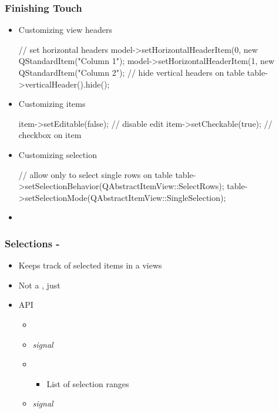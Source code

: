\begin{slide}[fragile]{}\frametitle{Finishing Touch}
\begin{itemize}
  \item Customizing view headers
  \begin{cpp}// set horizontal headers
model->setHorizontalHeaderItem(0, new QStandardItem("Column 1");
model->setHorizontalHeaderItem(1, new QStandardItem("Column 2");
// hide vertical headers on table
table->verticalHeader().hide();
\end{cpp}

  \item Customizing items
  \begin{cpp}item->setEditable(false); // disable edit
item->setCheckable(true); // checkbox on item
\end{cpp}

  \item Customizing selection
  \begin{cpp}// allow only to select single rows on table
table->setSelectionBehavior(QAbstractItemView::SelectRows);
table->setSelectionMode(QAbstractItemView::SingleSelection);
\end{cpp}

  \item {}
\end{itemize}
\end{slide}

\begin{slide}{}\frametitle{Selections - }
\begin{itemize}
  \item Keeps track of selected items in a views
  \item Not a , just 
  \item {} API
  \begin{itemize}
    \item {}
    \item \textit{signal} 
    \item {} 
      \begin{itemize}
        \item List of selection ranges
      \end{itemize}
      \item \textit{signal} 
  \end{itemize}
\end{itemize}
\end{slide}


